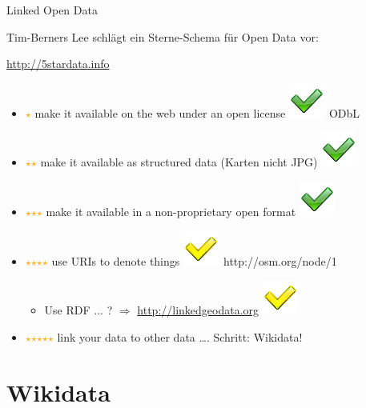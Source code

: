 \documentclass{beamer}
\newcommand{\boldm}[1] {\mathversion{bold}#1\mathversion{normal}}
\begin{document}
\begin{frame}{Linked Open Data}

  Tim-Berners Lee schlägt ein Sterne-Schema für Open Data vor:
 \vspace*{0.4cm}

  \url{http://5stardata.info}
 \vspace*{0.4cm}

  \begin{itemize}
    \item[] \textcolor{orange}{\boldm$\star$} make it available on the web under an open license \pause \includegraphics[width=.3cm]{check.png}~ODbL \pause
    \item[] \textcolor{orange}{\boldm$\star$$\star$} make it available as structured data (Karten nicht JPG) \pause  \includegraphics[width=.3cm]{check.png} \pause
    \item[] \textcolor{orange}{\boldm$\star$$\star$$\star$} make it available in a non-proprietary open format \pause  \includegraphics[width=.3cm]{check.png} \pause
    \item[] \textcolor{orange}{\boldm$\star$$\star$$\star$$\star$} use URIs to denote things \pause  \includegraphics[width=.3cm]{check-yellow.png}~http://osm.org/node/1 \pause
    \begin{itemize}
      \item[] \hspace{0.5cm}Use RDF ... ? \pause $\Rightarrow$ \url{http://linkedgeodata.org} \includegraphics[width=.3cm]{check-yellow.png} \pause
    \end{itemize}
    \item[] \textcolor{orange}{\boldm$\star$$\star$$\star$$\star$$\star$} link your data to other data \dots {}. Schritt: Wikidata!
  \end{itemize}


\end{frame}

\section{Wikidata}
\end{document}
